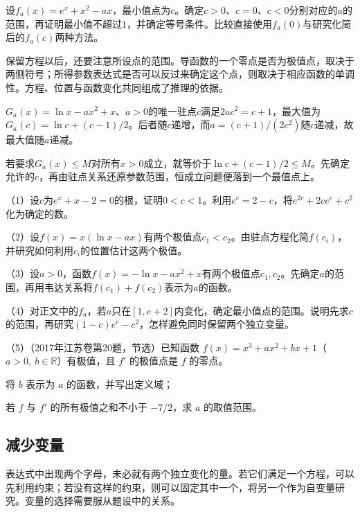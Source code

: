 \begin{example}
设\(f_a(x)=e^x+x^2-ax\)，最小值点为\(c\)。确定\(c>0\)、\(c=0\)、\(c<0\)分别对应的\(a\)的范围，再证明最小值不超过\(1\)，并确定等号条件。比较直接使用\(f_a(0)\)与研究化简后的\(f_a(c)\)两种方法。
\end{example}

保留方程以后，还要注意所设点的范围。导函数的一个零点是否为极值点，取决于两侧符号；所得参数表达式是否可以反过来确定这个点，则取决于相应函数的单调性。方程、位置与函数变化共同组成了推理的依据。

\(G_a(x)=\ln x-ax^2+x\)、\(a>0\)的唯一驻点\(c\)满足\(2ac^2=c+1\)，最大值为\(G_a(c)=\ln c+(c-1)/2\)。后者随\(c\)递增，而\(a=(c+1)/(2c^2)\)随\(c\)递减，故最大值随\(a\)递减。

若要求\(G_a(x)\le M\)对所有\(x>0\)成立，就等价于\(\ln c+(c-1)/2\le M\)。先确定允许的\(c\)，再由驻点关系还原参数范围，恒成立问题便落到一个最值点上。

\begin{exercise}
\mbox{}\par\nobreak

（1）设\(c\)为\(e^x+x-2=0\)的根，证明\(0<c<1\)。利用\(e^c=2-c\)，将\(e^{2c}+2ce^c+c^2\)化为确定的数。

（2）设\(f(x)=x(\ln x-ax)\)有两个极值点\(c_1<c_2\)。由驻点方程化简\(f(c_i)\)，并研究如何利用\(c_i\)的位置估计这两个极值。

（3）设\(a>0\)，函数\(f(x)=-\ln x-ax^2+x\)有两个极值点\(c_1,c_2\)。先确定\(a\)的范围，再用韦达关系将\(f(c_1)+f(c_2)\)表示为\(a\)的函数。

（4）对正文中的\(f_a\)，若\(a\)只在\([1,e+2]\)内变化，确定最小值点的范围。说明先求\(c\)的范围，再研究\((1-c)e^c-c^2\)，怎样避免同时保留两个独立变量。

（5）（2017年江苏卷第20题，节选）已知函数 \(f(x)=x^3+ax^2+bx+1\)（\(a>0,\ b\in\mathbb R\)）有极值，且 \(f'\) 的极值点是 \(f\) 的零点。

将 \(b\) 表示为 \(a\) 的函数，并写出定义域；

若 \(f\) 与 \(f'\) 的所有极值之和不小于 \(-7/2\)，求 \(a\) 的取值范围。
\end{exercise}

\subsection{减少变量}

表达式中出现两个字母，未必就有两个独立变化的量。若它们满足一个方程，可以先利用约束；若没有这样的约束，则可以固定其中一个，将另一个作为自变量研究。变量的选择需要服从题设中的关系。

